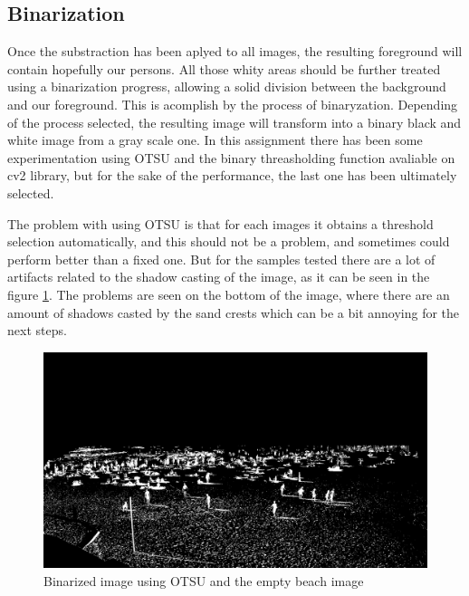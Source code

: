 \documentclass[10pt]{article}
\begin{document}
\subsection{Binarization}
Once the substraction has been aplyed to all images, the resulting foreground will contain hopefully our persons. All those whity areas should be further treated using a binarization progress, allowing a solid division between  the background and our foreground. This is acomplish by the process of binaryzation. Depending of the process selected, the resulting image will transform into a binary black and white image from a gray scale one. In this assignment there has been some experimentation using OTSU and the binary threasholding function avaliable on cv2 library, but for the sake of the performance, the last one has been ultimately selected.\newline

The problem with using OTSU is that for each images it obtains a threshold selection automatically, and this should not be a problem, and sometimes could perform better than a fixed one. But for the samples tested there are a lot of artifacts related to the shadow casting of the image, as it can be seen in the figure \ref{fig:otsu_bin}. The problems are seen on the bottom of the image, where there are an amount of shadows casted by the sand crests which can be a bit annoying for the next steps.\newline



\begin{figure} [hp]
    \centering
    \includegraphics[width=\textwidth]{img/OTSU_sub_arena.jpg}
    \caption{Binarized image using OTSU and the empty beach image}
    \label{fig:otsu_bin}
\end{figure}
\end{document}
